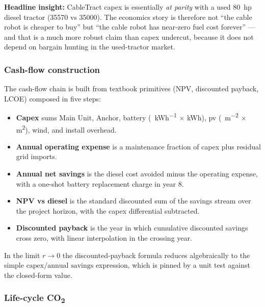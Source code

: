 \documentclass[11pt,a4paper]{article}
\begin{document}
\textbf{Headline insight:} CableTract \gls{capex} is essentially \emph{at parity} with a used \SI{80}{hp} diesel tractor (\SI{35570}{\EUR} vs \SI{35000}{\EUR}). The economics story is therefore not ``the cable robot is cheaper to buy'' but ``the cable robot has near-zero fuel cost forever'' --- and that is a much more robust claim than capex undercut, because it does not depend on bargain hunting in the used-tractor market.

\subsubsection{Cash-flow construction}\label{sec:cashflow}

The cash-flow chain is built from textbook primitives (NPV, discounted payback, LCOE) composed in five steps:

\begin{itemize}[leftmargin=1.6em,itemsep=0.1em]
    \item \textbf{Capex} sums Main Unit, Anchor, battery (\si{\EUR\per\kWh} $\times$ \si{\kWh}), \gls{pv} (\si{\EUR\per\meter\squared} $\times$ \si{\meter\squared}), wind, and install overhead.
    \item \textbf{Annual operating expense} is a maintenance fraction of \gls{capex} plus residual grid imports.
    \item \textbf{Annual net savings} is the diesel cost avoided minus the operating expense, with a one-shot battery replacement charge in year 8.
    \item \textbf{NPV vs diesel} is the standard discounted sum of the savings stream over the project horizon, with the capex differential subtracted.
    \item \textbf{Discounted payback} is the year in which cumulative discounted savings cross zero, with linear interpolation in the crossing year.
\end{itemize}

In the limit $r \to 0$ the discounted-payback formula reduces algebraically to the simple $\text{capex} / \text{annual savings}$ expression, which is pinned by a unit test against the closed-form value.

\subsubsection{Life-cycle CO\textsubscript{2}}\label{sec:lca}
\end{document}
